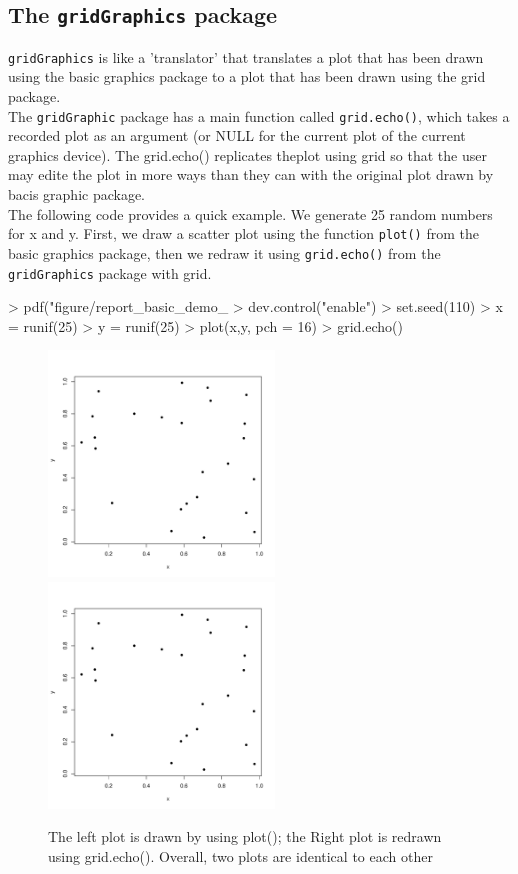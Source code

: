 \documentclass[a4paper,10pt]{article}
\begin{document}
\subsection{The \texttt{gridGraphics} package}
\texttt{gridGraphics} is like a 'translator' that translates a plot that has been drawn using the basic graphics package to a plot that has been drawn using the grid package. \\
The \texttt{gridGraphic} package has a main function called \texttt{grid.echo()}, which takes a recorded plot as an argument (or NULL for the current plot of the current graphics device). The grid.echo() replicates theplot using grid so that the user may edite the plot in more ways than they can with the original plot drawn by bacis graphic package.\\
The following code provides a quick example. We generate 25 random numbers for x and y. First, we draw a scatter plot using the function \texttt{plot()} from the basic graphics package, then we redraw it using \texttt{grid.echo()} from the \texttt{gridGraphics} package with grid.
\begin{Schunk}
\begin{Sinput}
> pdf("figure/report_basic_demo_%
> dev.control("enable")
> set.seed(110)
> x = runif(25)
> y = runif(25)
> plot(x,y, pch = 16)
> grid.echo()
\end{Sinput}
\end{Schunk}
\begin{figure}[h]
\begin{center}
  \includegraphics[height = 6cm, width = 6cm]{figure/report_basic_demo_1.pdf}
  \includegraphics[height = 6cm, width = 6cm]{figure/report_basic_demo_1.pdf}
  \caption{The left plot is drawn by using plot(); the Right plot is redrawn using grid.echo(). Overall, two plots are identical to each other}
  	\label{figure1}
\end{center}
\end{figure}
\end{document}
